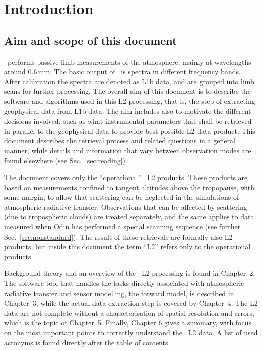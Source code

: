 \chapter{Introduction}
\label{chapter:introduction}

\setcounter{page}{1}


\section{Aim and scope of this document}
\label{sec:aim}
%
\smr\ performs passive limb measurements of the atmosphere, mainly at wavelengths
around 0.6\,mm. The basic output of \smr\ is spectra in different frequency
bands. After calibration the spectra are denoted as L1b data, and are grouped
into limb scans for further processing. The overall aim of this document is to
describe the software and algorithms used in this L2 processing, that is, the
step of extracting geophysical data from L1b data. The aim includes also to
motivate the different decisions involved, such as what instrumental parameters
that shall be retrieved in parallel to the geophysical data to provide best
possible L2 data product. This document describes the retrieval process and
related questions in a general manner, while details and information that
vary between observation modes are found elsewhere (see
Sec.~\ref{sec:reading}).

The document covers only the ``operational'' \smr\ L2 products. These products
are based on measurements confined to tangent altitudes above the tropopause,
with some margin, to allow that scattering can be neglected in the simulations
of atmospheric radiative transfer. Observations that can be affected by
scattering (due to tropospheric clouds) are treated separately, and the same
applies to data measured when Odin has performed a special scanning
sequence (see further Sec.~\ref{sec:nonstandard}). The result of these
retrievals are formally also L2 products, but inside this document the term
``L2'' refers only to the operational products.

Background theory and an overview of the \smr\ L2 processing is found in
Chapter~2. The software tool that handles the tasks directly associated with
atmospheric radiative transfer and sensor modelling, the forward model, is
described in Chapter~3, while the actual data extraction step is covered by
Chapter~4. The L2 data are not complete without a characterisation of
spatial resolution and errors, which is the topic of Chapter~5. Finally,
Chapter 6 gives a summary, with focus on the most important points to correctly
understand the \smr\ L2 data. A list of used acronyms is found directly after
the table of contents.




